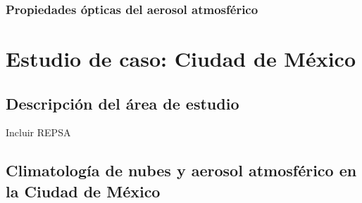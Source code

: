 \subsubsection{Propiedades ópticas del aerosol atmosférico}


\section{Estudio de caso: Ciudad de México}

\subsection{Descripción del área de estudio}

Incluir REPSA

\subsection{Climatología de nubes y aerosol atmosférico en la Ciudad de México}